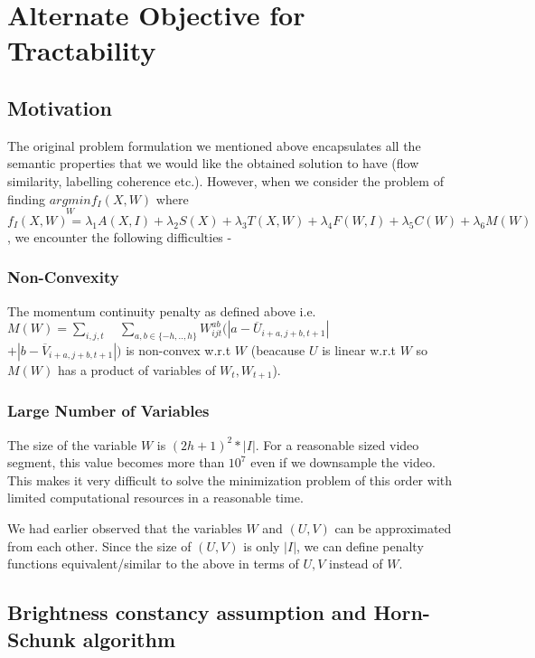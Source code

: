 \section{Alternate Objective for Tractability}


\subsection{Motivation}

The original problem formulation we mentioned above encapsulates all
the semantic properties that we would like the obtained solution to
have (flow similarity, labelling coherence etc.). However, when we
consider the problem of finding $\underset{W}{argmin}f_{I}(X,W)$
where $f_{I}(X,W)=\lambda_{1}A(X,I)+\lambda_{2}S(X)+\lambda_{3}T(X,W)+\lambda_{4}F(W,I)+\lambda_{5}C(W)+\lambda_{6}M(W)$,
we encounter the following difficulties -


\subsubsection*{Non-Convexity}

The momentum continuity penalty as defined above i.e. $M(W)=\underset{i,j,t}{\sum}\quad\underset{a,b\in\{-h,..,h\}}{\sum}W_{ijt}^{ab}(|a-\overline{U}_{i+a,j+b,t+1}|$ \\
$+|b-\overline{V}_{i+a,j+b,t+1}|)$
is non-convex w.r.t $W$ (beacause $U$ is linear w.r.t $W$ so $M(W)$
has a product of variables of $W_{t},W_{t+1}$).


\subsubsection*{Large Number of Variables}

The size of the variable $W$ is $(2h+1)^{2}*|I|$. For a reasonable
sized video segment, this value becomes more than $10^{7}$ even if
we downsample the video. This makes it very difficult to solve the
minimization problem of this order with limited computational resources in a reasonable time.

We had earlier observed that the variables $W$ and $(U,V)$ can be
approximated from each other. Since the size of $(U,V)$ is only $|I|$,
we can define penalty functions equivalent/similar to the above in
terms of $U,V$ instead of $W$.


\subsection{Brightness constancy assumption and Horn-Schunk algorithm}


